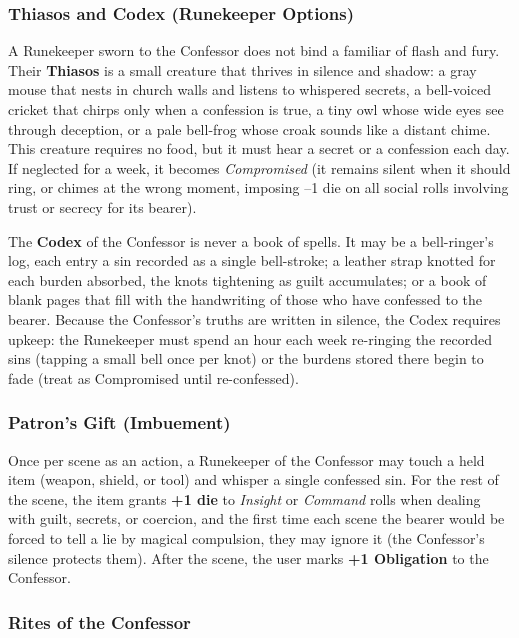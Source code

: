 \subsubsection*{Thiasos and Codex (Runekeeper Options)}

A Runekeeper sworn to the Confessor does not bind a familiar of flash and fury. Their \textbf{Thiasos} is a small creature that thrives in silence and shadow: a gray mouse that nests in church walls and listens to whispered secrets, a bell-voiced cricket that chirps only when a confession is true, a tiny owl whose wide eyes see through deception, or a pale bell-frog whose croak sounds like a distant chime. This creature requires no food, but it must hear a secret or a confession each day. If neglected for a week, it becomes \textit{Compromised} (it remains silent when it should ring, or chimes at the wrong moment, imposing --1 die on all social rolls involving trust or secrecy for its bearer).

The \textbf{Codex} of the Confessor is never a book of spells. It may be a bell-ringer's log, each entry a sin recorded as a single bell-stroke; a leather strap knotted for each burden absorbed, the knots tightening as guilt accumulates; or a book of blank pages that fill with the handwriting of those who have confessed to the bearer. Because the Confessor's truths are written in silence, the Codex requires upkeep: the Runekeeper must spend an hour each week re-ringing the recorded sins (tapping a small bell once per knot) or the burdens stored there begin to fade (treat as Compromised until re-confessed).

\subsubsection*{Patron's Gift (Imbuement)}

Once per scene as an action, a Runekeeper of the Confessor may touch a held item (weapon, shield, or tool) and whisper a single confessed sin. For the rest of the scene, the item grants \textbf{+1 die} to \textit{Insight} or \textit{Command} rolls when dealing with guilt, secrets, or coercion, and the first time each scene the bearer would be forced to tell a lie by magical compulsion, they may ignore it (the Confessor's silence protects them). After the scene, the user marks \textbf{+1 Obligation} to the Confessor.

\subsubsection*{Rites of the Confessor}

